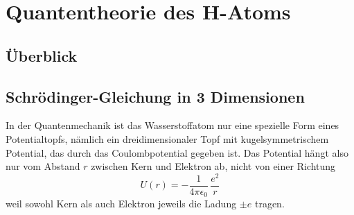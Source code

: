 \renewcommand{\lastmod}{7. November 2024}
\renewcommand{\chapterauthors}{Markus Lippitz}

\chapter{Quantentheorie des H-Atoms}









\section{Überblick}

\section{Schrödinger-Gleichung in 3 Dimensionen}
In der Quantenmechanik ist das Wasserstoffatom nur eine spezielle Form eines Potentialtopfs, nämlich ein dreidimensionaler Topf mit kugelsymmetrischem Potential, das durch das Coulombpotential gegeben ist. Das Potential hängt also nur vom Abstand $r$ zwischen Kern und Elektron ab, nicht von einer Richtung
\begin{equation}
    U(r) = - \frac{1}{4 \pi \epsilon_0} \, \frac{e^2}{r}
\end{equation}
weil sowohl Kern als auch Elektron jeweils die Ladung $\pm e$ tragen.

